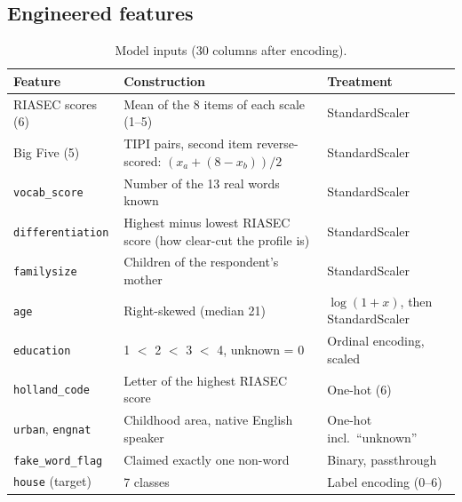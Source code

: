 \documentclass[11pt,a4paper]{article}
\begin{document}
\subsection{Engineered features}
\begin{table}[H]
\centering\small
\caption{Model inputs (30 columns after encoding).}
\label{tab:features}
\begin{tabularx}{\linewidth}{@{}l X l@{}}
\toprule
Feature & Construction & Treatment \\
\midrule
RIASEC scores (6) & Mean of the 8 items of each scale (1--5) & StandardScaler \\
Big Five (5) & TIPI pairs, second item reverse-scored: $(x_a + (8 - x_b))/2$ & StandardScaler \\
\texttt{vocab\_score} & Number of the 13 real words known & StandardScaler \\
\texttt{differentiation} & Highest minus lowest RIASEC score (how clear-cut the profile is) & StandardScaler \\
\texttt{familysize} & Children of the respondent's mother & StandardScaler \\
\texttt{age} & Right-skewed (median 21) & $\log(1+x)$, then StandardScaler \\
\texttt{education} & 1 $<$ 2 $<$ 3 $<$ 4, unknown = 0 & Ordinal encoding, scaled \\
\texttt{holland\_code} & Letter of the highest RIASEC score & One-hot (6) \\
\texttt{urban}, \texttt{engnat} & Childhood area, native English speaker & One-hot incl.\ ``unknown'' \\
\texttt{fake\_word\_flag} & Claimed exactly one non-word & Binary, passthrough \\
\midrule
\texttt{house} (target) & 7 classes & Label encoding (0--6) \\
\bottomrule
\end{tabularx}
\end{table}
\end{document}

